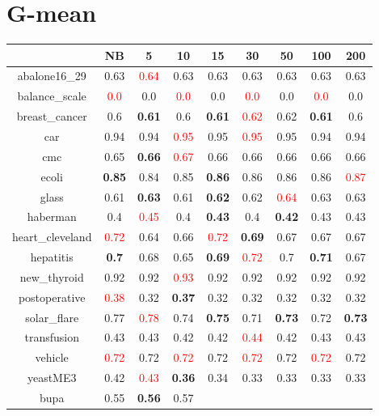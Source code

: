 \documentclass{article}%
\begin{document}
\section*{G{-}mean}%
\begin{tabular}{c|cccccccc}%
\hline%
&NB&5&10&15&30&50&100&200\\%
\hline%
abalone16\_29&0.63&\textcolor{red}{ 
0.64
}&0.63&0.63&0.63&0.63&0.63&0.63\\%
\hline%
balance\_scale&\textcolor{red}{ 
0.0
}&0.0&\textcolor{red}{ 
0.0
}&0.0&\textcolor{red}{ 
0.0
}&0.0&\textcolor{red}{ 
0.0
}&0.0\\%
\hline%
breast\_cancer&0.6&\textbf{0.61}&0.6&\textbf{0.61}&\textcolor{red}{ 
0.62
}&0.62&\textbf{0.61}&0.6\\%
\hline%
car&0.94&0.94&\textcolor{red}{ 
0.95
}&0.95&\textcolor{red}{ 
0.95
}&0.95&0.94&0.94\\%
\hline%
cmc&0.65&\textbf{0.66}&\textcolor{red}{ 
0.67
}&0.66&0.66&0.66&0.66&0.66\\%
\hline%
ecoli&\textbf{0.85}&0.84&0.85&\textbf{0.86}&0.86&0.86&0.86&\textcolor{red}{ 
0.87
}\\%
\hline%
glass&0.61&\textbf{0.63}&0.61&\textbf{0.62}&0.62&\textcolor{red}{ 
0.64
}&0.63&0.63\\%
\hline%
haberman&0.4&\textcolor{red}{ 
0.45
}&0.4&\textbf{0.43}&0.4&\textbf{0.42}&0.43&0.43\\%
\hline%
heart\_cleveland&\textcolor{red}{ 
0.72
}&0.64&0.66&\textcolor{red}{ 
0.72
}&\textbf{0.69}&0.67&0.67&0.67\\%
\hline%
hepatitis&\textbf{0.7}&0.68&0.65&\textbf{0.69}&\textcolor{red}{ 
0.72
}&0.7&\textbf{0.71}&0.67\\%
\hline%
new\_thyroid&0.92&0.92&\textcolor{red}{ 
0.93
}&0.92&0.92&0.92&0.92&0.92\\%
\hline%
postoperative&\textcolor{red}{ 
0.38
}&0.32&\textbf{0.37}&0.32&0.32&0.32&0.32&0.32\\%
\hline%
solar\_flare&0.77&\textcolor{red}{ 
0.78
}&0.74&\textbf{0.75}&0.71&\textbf{0.73}&0.72&\textbf{0.73}\\%
\hline%
transfusion&0.43&0.43&0.42&0.42&\textcolor{red}{ 
0.44
}&0.42&0.43&0.43\\%
\hline%
vehicle&\textcolor{red}{ 
0.72
}&0.72&\textcolor{red}{ 
0.72
}&0.72&\textcolor{red}{ 
0.72
}&0.72&\textcolor{red}{ 
0.72
}&0.72\\%
\hline%
yeastME3&0.42&\textcolor{red}{ 
0.43
}&\textbf{0.36}&0.34&0.33&0.33&0.33&0.33\\%
\hline%
bupa&0.55&\textbf{0.56}&0.57&\textcolor{red}{ 
}
\end{tabular}
\end{document}
